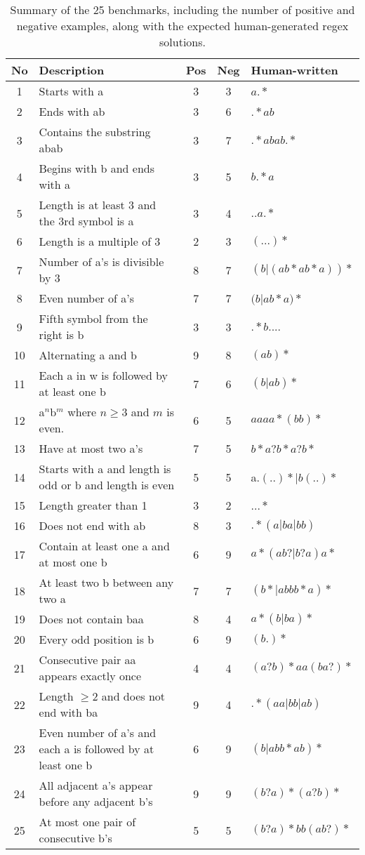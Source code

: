 \begin{table}[h!]
	\centering
	\label{tab:alpha_regex_performance_s}
	\caption{Summary of the 25 benchmarks, including the number of positive and negative examples, along with the expected human-generated regex solutions.}
	\begin{tabular}{|c|p{9.9cm}|c|c|p{3cm}|}
	\hline
	\textbf{No} & \textbf{Description} & \textbf{Pos} & \textbf{Neg} & \textbf{Human-written} \\
	\hline
	1 & Starts with a & 3 & 3 & $a.*$ \\
	2 & Ends with ab & 3 & 6 & $.*ab$ \\
	3 & Contains the substring abab & 3 & 7 & $.*abab.*$ \\
	4 & Begins with b and ends with a & 3 & 5 & $b.*a$ \\
	5 & Length is at least 3 and the 3rd symbol is a & 3 & 4 & $..a.*$ \\
	6 & Length is a multiple of 3 & 2 & 3 & $(...)*$ \\
	7 & Number of a's is divisible by 3 & 8 & 7 & $(b|(ab*ab*a))*$ \\
	8 & Even number of a's & 7 & 7 & $(b$|$ab*a)*$ \\
	9 & Fifth symbol from the right is b & 3 & 3 & $.*b....$ \\
	10 & Alternating a and b & 9 & 8 & $(ab)*$ \\
	11 & Each a in w is followed by at least one b & 7 & 6 & $(b|ab)*$ \\
	12 & a$^n$b$^m$ where $n \geq 3$ and $m$ is even. & 6 & 5 & $aaaa*(bb)*$ \\
	13 & Have at most two a's & 7 & 5 & $b*a?b*a?b*$ \\
	14 & Starts with a and length is odd or b and length is even & 5 & 5 & a.$(..)*|b(..)*$ \\
	15 & Length greater than 1 & 3 & 2 & $...*$ \\
	16 & Does not end with ab & 8 & 3 & $.*(a|ba|bb)$ \\
	17 & Contain at least one a and at most one b & 6 & 9 & $a*(ab?|b?a)a*$ \\
	18 & At least two b between any two a & 7 & 7 & $(b*|abbb*a)*$ \\
	19 & Does not contain baa & 8 & 4 & $a*(b|ba)*$ \\
	20 & Every odd position is b & 6 & 9 & $(b.)*$ \\
	21 & Consecutive pair aa appears exactly once & 4 & 4 & $(a?b)*aa(ba?)*$ \\
	22 & Length $\ge 2$ and does not end with ba & 9 & 4 & $.*(aa|bb|ab)$ \\
	23 & Even number of a's and each a is followed by at least one b & 6 & 9 & $(b|abb*ab)*$ \\
	24 & All adjacent a's appear before any adjacent b's & 9 & 9 & $(b?a)*(a?b)*$ \\
	25 & At most one pair of consecutive b's & 5 & 5 & $(b?a)*bb(ab?)*$ \\
	\hline
	\end{tabular}
	\end{table}

